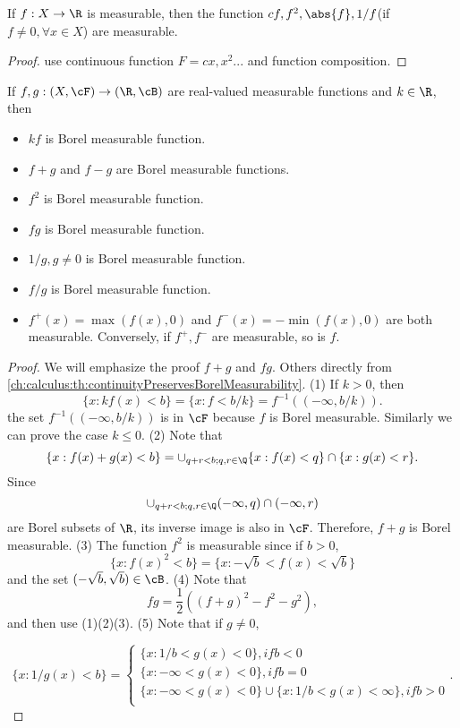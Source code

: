 \begin{refsection}
\begin{corollary}
	\cite[362]{johnsonbaugh2010foundations} If $f:X\to \R$ is measurable, then the function $cf,f^2,\abs{f},1/f$(if $f\neq 0,\forall x\in X$) are measurable.
\end{corollary}
\begin{proof}
	use continuous function $F=cx,x^2...$ and function composition.	
\end{proof}

\begin{lemma}\cite[362-364]{johnsonbaugh2010foundations}\label{ch:calculus:th:AlgebraicPropertiesBorelMeasurableFunctions}
If $f,g: (X,\cF)\to (\R, \cB)$ are real-valued measurable functions and $k\in \R$, then
\begin{itemize}
	\item $kf$ is Borel measurable function.
	\item $f+g$ and $f-g$ are Borel measurable functions.
	\item $f^2$ is Borel measurable function.
	\item $fg$ is Borel measurable function.
	\item $1/g, g\neq 0$ is Borel measurable function.
	\item $f/g$ is Borel measurable function.
	\item $f^+(x) = \max(f(x),0)$ and $f^-(x) = -\min(f(x),0)$ are both measurable. Conversely, if $f^+,f^-$ are measurable, so is $f$.
\end{itemize}	
\end{lemma}
\begin{proof}
We will emphasize the proof $f+g$ and $fg$. Others directly from \autoref{ch:calculus:th:continuityPreservesBorelMeasurability}. (1) If $k>0$, then $$\{x:kf(x) < b\} = \{x:f<b/k\} = f^{-1}((-\infty,b/k)).$$
the set $f^{-1}((-\infty,b/k))$ is in $\cF$ because $f$ is Borel measurable. Similarly we can prove the case $k\leq 0$. (2) Note that
$$\{x:f(x)+g(x)<b \} = \cup_{q+r<b;q,r\in \Q} \{x:f(x)<q \}\cap \{x:g(x) < r\}.$$ 
Since 
$$\cup_{q+r<b;q,r\in \Q} (-\infty,q)\cap (-\infty,r)$$
are Borel subsets of $\R$, its inverse image is also in $\cF$. Therefore, $f+g$ is Borel measurable.
(3) The function $f^2$ is measurable since if $b > 0$,
$$\{x:f(x)^2 < b\} = \{x:-\sqrt{b} < f(x) < \sqrt{b}\}$$
and the set $(-\sqrt{b},\sqrt{b}) \in \cB$. 
(4) Note that
$$fg = \frac{1}{2}((f+g)^2 - f^2 - g^2),$$
and then use (1)(2)(3).
(5) Note that if $g\neq 0$,

$$\{x:1/g(x) < b\} = \begin{cases*}
\{x: 1/b < g(x) < 0\}, if b < 0 \\
\{x: -\infty < g(x) < 0\}, if b = 0 \\
\{x: -\infty < g(x) < 0\}\cup \{x: 1/b < g(x) < \infty\}, if b > 0 \\
\end{cases*}.$$



\end{proof}
\end{refsection}
